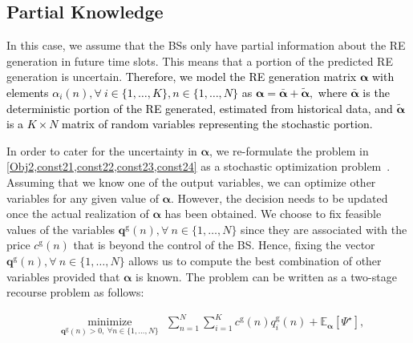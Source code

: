 \documentclass[10pt, letter,twocolumn]{IEEEtran}
\begin{document}
\vspace{-0.0cm}
\subsection{Partial Knowledge}\vspace{-0.0cm}
\normalsize
In this case, we assume that the BSs only have partial information about the RE generation in future time slots. This means that a portion of the predicted RE generation is uncertain. \textcolor{black}{Therefore, we model the RE generation matrix $\boldsymbol{\alpha}$ with elements $\alpha_{i}(n), \forall \ i \in \{1,\ldots,K\},n \in \{ 1,\ldots,N\}$ as $\boldsymbol{\alpha} = \bar{\boldsymbol{\alpha}} + \tilde{\boldsymbol{\alpha}},$ where $\bar{\boldsymbol{\alpha}}$ is the deterministic portion of the RE generated, estimated from historical data, and $\boldsymbol{\tilde{\alpha}}$ is a $K\times N$ matrix of random variables representing the stochastic portion.} %


In order to cater for the uncertainty in $\boldsymbol{\alpha}$, we re-formulate the problem in \cref{Obj2,const21,const22,const23,const24} as a stochastic optimization problem~\cite{stochastic_programming2}. Assuming that we know one of the output variables, we can optimize other variables for any given value of $\boldsymbol{\alpha}$. However, the decision needs to be updated once the actual realization of $\boldsymbol{\alpha}$ has been obtained. We choose to fix feasible values of the variables $\mathbf{q}^{\text{g}}(n), \forall \ n \in \{ 1, \ldots,N\}$ since they are associated with the price $c^{\text{g}}(n)$ that is beyond the control of the BS. Hence, fixing the vector $\mathbf{q}^{\text{g}}(n), \forall \ n \in \{ 1, \ldots,N\}$ allows us to compute the best combination of other variables provided that $\boldsymbol{\alpha}$ is known. The problem can be written as a two-stage recourse problem as follows:

\vspace{-0.0in}
\small
\begin{align}
& \underset{\mathbf{q}^{\text{g}}(n) > 0, \ \forall n \in \{1,\ldots,N\}}{\text{minimize}} \ \ \
 \sum \limits_{n=1}^{N} \sum \limits_{i=1}^{K} c^{\text{g}}(n) q_{i}^{\text{g}}(n) + \mathbb{E}_{\boldsymbol{\alpha}} [ \Psi^{\star} ], \label{Obj3}
\end{align}
\end{document}
